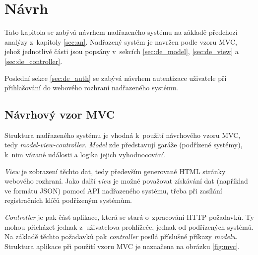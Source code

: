 \chapter{Návrh}
\label{sec:de}

Tato kapitola se zabývá návrhem nadřazeného systému na základě předchozí analýzy z~kapitoly \ref{sec:an}. Nadřazený systém je navržen podle vzoru MVC, jehož jednotlivé části jsou popsány v~sekcích \ref{sec:de_model}, \ref{sec:de_view} a \ref{sec:de_controller}.

Poslední sekce \ref{sec:de_auth} se zabývá návrhem autentizace uživatele při přihlašování do webového rozhraní nadřazeného systému.
 
\section{Návrhový vzor MVC}
\label{sec:de_mvc}

Struktura nadřazeného systému je vhodná k~použití návrhového vzoru MVC, tedy \textit{model-view-controller}. \textit{Model} zde představují garáže (podřízené systémy), k~nim vázané události a logika jejich vyhodnocování. 

\textit{View} je zobrazení těchto dat, tedy především generované HTML stránky webového rozhraní. Jako další \textit{view} je možné považovat získávání dat (například ve formátu JSON) pomocí API nadřazeného systému, třeba při zasílání registračních klíčů podřízeným systémům.

\textit{Controller} je pak část aplikace, která se stará o~zpracování HTTP požadavků. Ty mohou přicházet jednak z~uživatelova prohlížeče, jednak od podřízených systémů. Na základě těchto požadavků pak \textit{controller} posílá příslušné příkazy \textit{modelu}. Struktura aplikace při použití vzoru MVC je naznačena na obrázku \ref{fig:mvc}.

